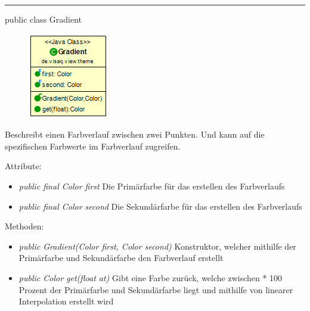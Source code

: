 \rule{\textwidth}{0.4pt}
public class Gradient

\begin{minipage}{0.3\textwidth}
    \begin{figure}[H]
    \includegraphics[scale = 0.5]{media/frontend/view/de.view.elements.theme/Gradient_Class.png}
    \end{figure}
    \end{minipage} \hfill
    \begin{minipage}{0.6\textwidth}
    Beschreibt einen Farbverlauf zwischen zwei Punkten. Und kann auf die spezifischen Farbwerte im Farbverlauf zugreifen.
    \end{minipage}

    Attribute:
\begin{itemize}
    \item \emph{public final Color first} Die Primärfarbe für das erstellen des Farbverlaufs
    \item \emph{public final Color second} Die Sekundärfarbe für das erstellen des Farbverlaufs
\end{itemize}
Methoden:
\begin{itemize}
    \item \emph{public Gradient(Color first, Color second)} Konstruktor, welcher mithilfe der Primärfarbe und Sekundärfarbe den Farbverlauf erstellt
    \item \emph{public Color get(float at)} Gibt eine Farbe zurück, welche zwischen * 100 Prozent der Primärfarbe und Sekundärfarbe liegt und mithilfe von linearer Interpolation erstellt wird
\end{itemize}
